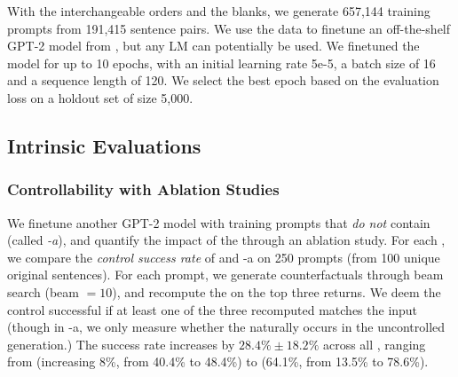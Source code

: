 
With the interchangeable orders and the blanks, we generate 657,144 training prompts from 191,415 sentence pairs.
We use the data to finetune an off-the-shelf GPT-2 model from \citet{Wolf2019HuggingFacesTS}, but any LM can potentially be used.
We finetuned the model for up to 10 epochs, with an initial learning rate 5e-5, a batch size of 16 and a sequence length of 120.
We select the best epoch based on the evaluation loss on a holdout set of size 5,000.


\subsection{Intrinsic Evaluations}
\label{appendix:intrinsic}






\subsubsection{Controllability with Ablation Studies}
\label{appendix:ablation_control}

We finetune another GPT-2 model with training prompts that \emph{do not} contain \tagstrs (called \emph{\sysname-a}), and quantify the impact of the \tagstrshorts through an ablation study.
For each \tagstr, we compare the \emph{control success rate} of \sysname and \sysname-a on 250 prompts (from 100 unique original sentences).
For each prompt, we generate counterfactuals through beam search (beam $=10$), and recompute the \tagstrshorts on the top three returns.
We deem the control successful if at least one of the three recomputed \tagstrshorts matches the input (though in \sysname-a, we only measure whether the \tagstrshort naturally occurs in the uncontrolled generation.)
The success rate increases by $28.4\% \pm 18.2\%$ across all \tagstrs, ranging from  (increasing 8\%, from 40.4\% to 48.4\%) to  (64.1\%, from 13.5\% to 78.6\%).

